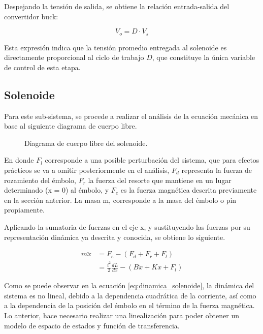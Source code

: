 \documentclass[journal]{IEEEtran}
\begin{document}
Despejando la tensión de salida, se obtiene la relación entrada-salida 
del convertidor buck:

\begin{equation}
    V_o = D \cdot V_s
    \label{eq:buck_vo}
\end{equation}

Esta expresión indica que la tensión promedio entregada al solenoide 
es directamente proporcional al ciclo de trabajo $D$, que constituye 
la única variable de control de esta etapa.

\subsection{Solenoide}
Para este sub-sistema, se procede a realizar el análisis de la ecuación mecánica en base al 
siguiente diagrama de cuerpo libre. 

\begin{figure}[H]
  \centering
   
  \caption{Diagrama de cuerpo libre del solenoide.}
  \label{fig:diagrama_cuerpolibre_solenoide}
\end{figure}

En donde $F_l$ corresponde a una posible perturbación del sistema, que para efectos prácticos se va a omitir posteriormente
en el análisis, $F_d$ representa la fuerza de rozamiento del émbolo, $F_r$ la fuerza del resorte que mantiene en un lugar
determinado (x = 0) al émbolo, y $F_e$ es la fuerza magnética descrita previamente en la sección anterior. La masa m, corresponde
a la masa del émbolo o pin propiamente.

Aplicando la sumatoria de fuerzas en el eje x, y sustituyendo las fuerzas por su representación dinámica ya descrita y conocida, 
se obtiene lo siguiente.

\begin{equation}
\begin{aligned}
        m \ddot{x} &= F_e - (F_d + F_r + F_l) \\
                   &= \frac{i^2}{2} \frac{dL}{dx} - (B \dot{x} + K x + F_l)
\end{aligned}
\label{eq:dinamica_solenoide}
\end{equation}

Como se puede observar en la ecuación \ref{eq:dinamica_solenoide}, la dinámica del sistema es no lineal, debido a la dependencia cuadrática 
de la corriente, así como a la dependencia de la posición del émbolo en el término de la fuerza magnética. Lo anterior, hace necesario
realizar una linealización para poder obtener un modelo de espacio de estados y función de transferencia.
\end{document}
